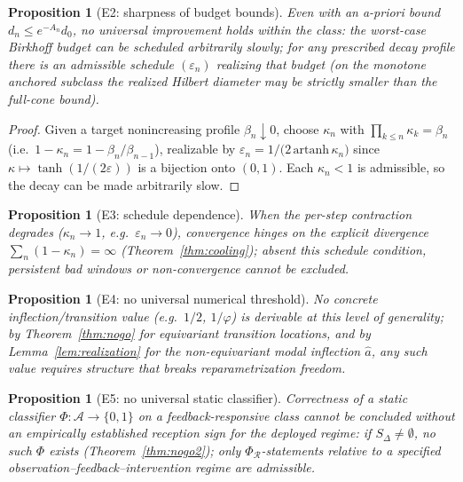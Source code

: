 \documentclass[11pt]{article}
\theoremstyle{plain}
\newtheorem{proposition}[theorem]{Proposition}
\theoremstyle{definition}
\theoremstyle{remark}
\begin{document}
\begin{proposition}[E2: sharpness of budget bounds]\label{E2}
Even with an a-priori bound $d_n\le e^{-A_n}d_0$, no universal improvement holds within the class: the worst-case Birkhoff budget can be scheduled arbitrarily slowly; for any prescribed decay profile there is an admissible schedule $(\varepsilon_n)$ realizing that budget (on the monotone anchored subclass the realized Hilbert diameter may be strictly smaller than the full-cone bound).
\end{proposition}
\begin{proof}
Given a target nonincreasing profile $\beta_n\downarrow0$, choose $\kappa_n$ with $\prod_{k\le n}\kappa_k=\beta_n$ (i.e.\ $1-\kappa_n=1-\beta_n/\beta_{n-1}$), realizable by $\varepsilon_n=1/\big(2\,\mathrm{artanh}\,\kappa_n\big)$ since $\kappa\mapsto\tanh(1/(2\varepsilon))$ is a bijection onto $(0,1)$. Each $\kappa_n<1$ is admissible, so the decay can be made arbitrarily slow.
\end{proof}

\begin{proposition}[E3: schedule dependence]\label{E3}
When the per-step contraction degrades ($\kappa_n\to1$, e.g.\ $\varepsilon_n\to0$), convergence hinges on the explicit divergence $\sum_n(1-\kappa_n)=\infty$ (Theorem~\ref{thm:cooling}); absent this schedule condition, persistent bad windows or non-convergence cannot be excluded.
\end{proposition}

\begin{proposition}[E4: no universal numerical threshold]\label{E4}
No concrete inflection/transition value (e.g.\ $1/2$, $1/\varphi$) is derivable at this level of generality; by Theorem~\ref{thm:nogo} for equivariant transition locations, and by Lemma~\ref{lem:realization} for the non-equivariant modal inflection $\hat a$, any such value requires structure that breaks reparametrization freedom.
\end{proposition}

\begin{proposition}[E5: no universal static classifier]\label{E5}
Correctness of a static classifier $\Phi:\mathcal A\to\{0,1\}$ on a feedback-responsive class cannot be concluded without an empirically established reception sign for the deployed regime: if $S_\Delta\ne\emptyset$, no such $\Phi$ exists (Theorem~\ref{thm:nogo2}); only $\Phi_{\mathcal R}$-statements relative to a specified observation--feedback--intervention regime are admissible.
\end{proposition}
\end{document}
